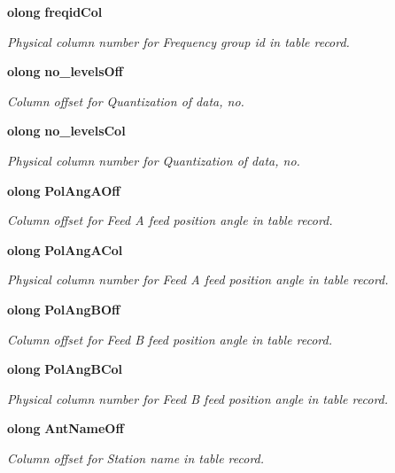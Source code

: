 \begin{CompactItemize}
{\bf olong} {\bf freqid\-Col}
\begin{CompactList}\small\item\em Physical column number for Frequency group id in table record. \item\end{CompactList}\item 
{\bf olong} {\bf no\_\-levels\-Off}
\begin{CompactList}\small\item\em Column offset for Quantization of data, no. \item\end{CompactList}\item 
{\bf olong} {\bf no\_\-levels\-Col}
\begin{CompactList}\small\item\em Physical column number for Quantization of data, no. \item\end{CompactList}\item 
{\bf olong} {\bf Pol\-Ang\-AOff}
\begin{CompactList}\small\item\em Column offset for Feed A feed position angle in table record. \item\end{CompactList}\item 
{\bf olong} {\bf Pol\-Ang\-ACol}
\begin{CompactList}\small\item\em Physical column number for Feed A feed position angle in table record. \item\end{CompactList}\item 
{\bf olong} {\bf Pol\-Ang\-BOff}
\begin{CompactList}\small\item\em Column offset for Feed B feed position angle in table record. \item\end{CompactList}\item 
{\bf olong} {\bf Pol\-Ang\-BCol}
\begin{CompactList}\small\item\em Physical column number for Feed B feed position angle in table record. \item\end{CompactList}\item 
{\bf olong} {\bf Ant\-Name\-Off}
\begin{CompactList}\small\item\em Column offset for Station name in table record. \item\end{CompactList}\item 

\end{CompactItemize}
